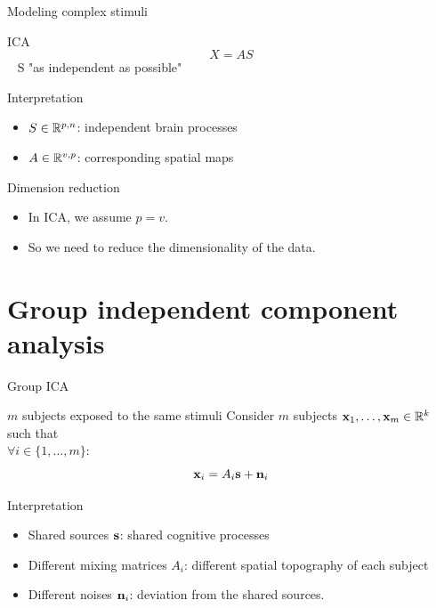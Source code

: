 \documentclass[bigger]{beamer}
\begin{document}
\begin{frame}{Modeling complex stimuli}
  \begin{block}{ICA}
    \begin{equation*}
    X = AS
    \end{equation*}
    $\enspace $ S "as independent as possible"
  \end{block}

  \pause
  \begin{block}{Interpretation}
    \begin{itemize}
   \item $S \in \mathbb{R}^{p, n}$: independent brain processes
   \item $A \in \mathbb{R}^{v, p}$: corresponding spatial maps
     \end{itemize}
  \end{block}
  \pause
  \begin{block}{Dimension reduction}
    \begin{itemize}
    \item In ICA, we assume $p=v$.
    \item So we need to reduce the dimensionality of the data.
    \end{itemize}
  \end{block}

\end{frame}

\section{Group independent component analysis}
\begin{frame}{Group ICA}
\begin{block}{$m$ subjects exposed to the same stimuli}
  Consider $m$ subjects \(\mathbf{x}_1, \dots, \mathbf{x}_m \in \mathbb{R}^k\)
  such that \\ $\forall i \in \{1, \dots, m\}$:
  \begin{equation*}
  \mathbf{x}_i = A_i \mathbf{s} + \mathbf{n}_i
  \end{equation*}
\end{block}
\begin{block}{Interpretation}
  \begin{itemize}
  \item Shared sources $\mathbf{s}$: shared cognitive processes 
  \item Different mixing matrices $A_i$: different spatial topography of each subject
  \item Different noises $\mathbf{n}_i$: deviation from the shared sources.
  \end{itemize}
\end{block}
\end{frame}
\end{document}
